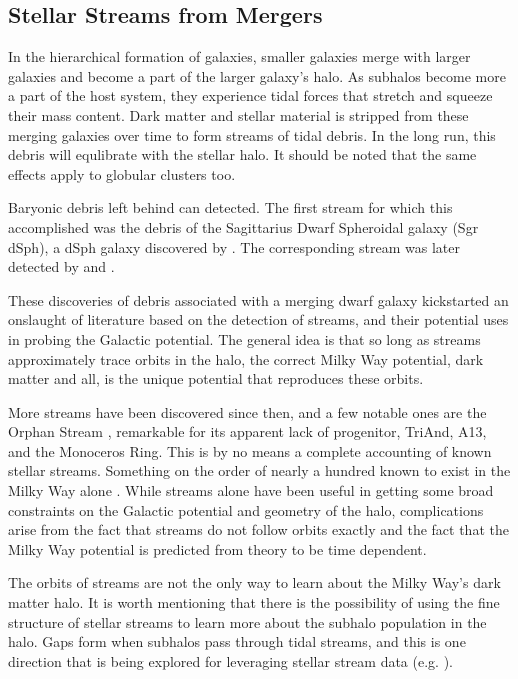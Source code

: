 \subsection{Stellar Streams from Mergers}

In the hierarchical formation of galaxies, smaller galaxies merge with larger galaxies and become a part of the larger galaxy's halo. As subhalos become more a part of the host system, they experience tidal forces that stretch and squeeze their mass content. Dark matter and stellar material is stripped from these merging galaxies over time to form streams of tidal debris. In the long run, this debris will equlibrate with the stellar halo. It should be noted that the same effects apply to globular clusters too.

Baryonic debris left behind can detected. The first stream for which this accomplished was the debris of the Sagittarius Dwarf Spheroidal galaxy (Sgr dSph), a dSph galaxy discovered by \citet{ibata_discovery}. The corresponding stream was later detected by \citet{newberg_2002} and \citet{majewski_2003}. 

These discoveries of debris associated with a merging dwarf galaxy kickstarted an onslaught of literature based on the detection of streams, and their potential uses in probing the Galactic potential. The general idea is that so long as streams approximately trace orbits in the halo, the correct Milky Way potential, dark matter and all, is the unique potential that reproduces these orbits. 

More streams have been discovered since then, and a few notable ones are the Orphan Stream \citep{grillmair_2006,belokurov_2007,newberg_2010}, remarkable for its apparent lack of progenitor, TriAnd, A13, and the Monoceros Ring. This is by no means a complete accounting of known stellar streams. Something on the order of nearly a hundred known to exist in the Milky Way alone \citep{sanders_binney_2013_a, ibata_2019}. While streams alone have been useful in getting some broad constraints on the Galactic potential and geometry of the halo, complications arise from the fact that streams do not follow orbits exactly \citet{sanders_binney_2013_a} and the fact that the Milky Way potential is predicted from theory to be time dependent.

The orbits of streams are not the only way to learn about the Milky Way's dark matter halo. It is worth mentioning that there is the possibility of using the fine structure of stellar streams to learn more about the subhalo population in the halo.  Gaps form when subhalos pass through tidal streams, and this is one direction that is being explored for leveraging stellar stream data (e.g. \citet{erkal_2016_stream_gaps}).

